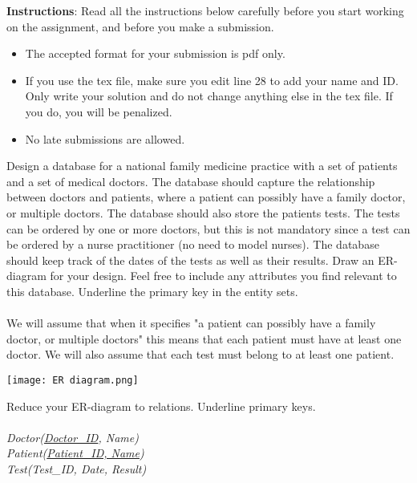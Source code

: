 \documentclass[a4 paper]{article}
\begin{document}
\textbf{Instructions}: Read all the instructions below carefully before you start working on the assignment, and before you make a submission.
\begin{itemize}
    \item The accepted format for your submission is pdf only.
    \item If you use the tex file, make sure you edit line 28 to add your name and ID. Only write your solution and do not change anything else in the tex file. If you do, you will be penalized.
    \item No late submissions are allowed.
\end{itemize}



Design a database for a national family medicine practice with a set of patients and a set of medical doctors. The database should capture the relationship between doctors and patients, where a patient can possibly have a family doctor, or multiple doctors. The database should also store the patients tests. The tests can be ordered by one or more doctors, but this is not mandatory since a test can be ordered by a nurse practitioner (no need to model nurses). The database should keep track of the dates of the tests as well as their results. Draw an ER-diagram for your design. Feel free to include any attributes you find relevant to this database. Underline the primary key in the entity sets.\\\\

We will assume that when it specifies "a patient can possibly have a family doctor, or multiple doctors" this means that each patient must have at least one doctor. We will also assume that each test must belong to at least one patient.\\
\begin{center}
\texttt{[image: ER diagram.png]}
\end{center}

Reduce your ER-diagram to relations. Underline primary keys.\\\\
\textit{Doctor(\underline{Doctor\_ID}, Name)}\\
\textit{Patient(\underline{Patient\_ID, Name})}\\
\textit{Test(Test\_ID, Date, Result)}
\end{document}
